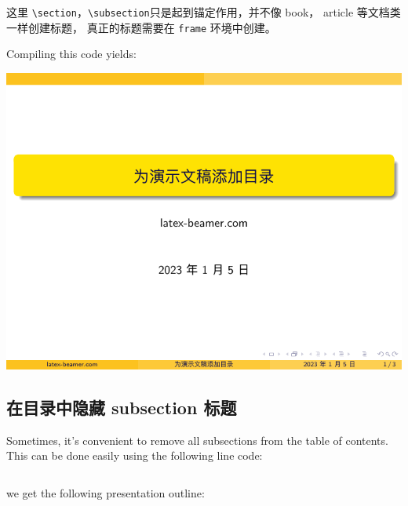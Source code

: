 \inputminted[linenos=true]{latex}{examples/beamer/beamertoc01.tex}

\begin{remark*}
  这里 \verb|\section|，\verb|\subsection|只是起到锚定作用，并不像 book， article 等文档类一样创建标题，
  真正的标题需要在 \verb|frame| 环境中创建。
\end{remark*}

Compiling this code yields:

\includegraphics[page=2]{examples/beamer/beamertoc01.pdf}

\subsection{在目录中隐藏 {\ttfamily subsection} 标题}

Sometimes, it’s convenient to remove all subsections from the table of contents. This can be done easily using the following line code:

\inputminted[linenos=true]{latex}{examples/beamer/beamertoc02.tex}

we get the following presentation outline:

